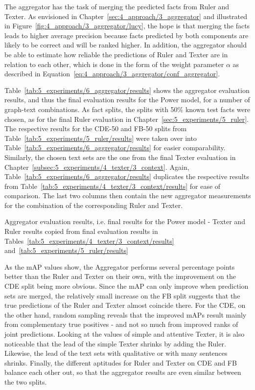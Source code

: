 The aggregator has the task of merging the predicted facts from Ruler and Texter. As envisioned in Chapter~\ref{sec:4_approach/3_aggregator} and illustrated in Figure~\ref{fig:4_approach/3_aggregator/lucy}, the hope is that merging the facts leads to higher average precision because facts predicted by both components are likely to be correct and will be ranked higher. In addition, the aggregator should be able to estimate how reliable the predictions of Ruler and Texter are in relation to each other, which is done in the form of the weight parameter $\alpha$ as described in Equation~\ref{eq:4_approach/3_aggregator/conf_aggregator}.

Table~\ref{tab:5_experiments/6_aggregator/results} shows the aggregator evaluation results, and thus the final evaluation results for the Power model, for a number of graph-text combinations. As fact splits, the splits with 50\% known test facts were chosen, as for the final Ruler evaluation in Chapter~\ref{sec:5_experiments/5_ruler}. The respective results for the CDE-50 and FB-50 splits from Table~\ref{tab:5_experiments/5_ruler/results} were taken over into Table~\ref{tab:5_experiments/6_aggregator/results} for easier comparability. Similarly, the chosen text sets are the one from the final Texter evaluation in Chapter~\ref{subsec:5_experiments/4_texter/3_context}. Again, Table~\ref{tab:5_experiments/6_aggregator/results} duplicates the respective results from Table~\ref{tab:5_experiments/4_texter/3_context/results} for ease of comparison. The last two columns then contain the new aggregator measurements for the combination of the corresponding Ruler and Texter.

\begin{table}[h]
    \makebox[\textwidth][c]{
        
    }
    \caption{Aggregator evaluation results, i.e. final results for the Power model - Texter and Ruler results copied from final evaluation results in Tables~\ref{tab:5_experiments/4_texter/3_context/results} and~\ref{tab:5_experiments/5_ruler/results}}
    \label{tab:5_experiments/6_aggregator/results}
\end{table}

As the mAP values show, the Aggregator performs several percentage points better than the Ruler and Texter on their own, with the improvement on the CDE split being more obvious. Since the mAP can only improve when prediction sets are merged, the relatively small increase on the FB split suggests that the true predictions of the Ruler and Texter almost coincide there. For the CDE, on the other hand, random sampling reveals that the improved mAPs result mainly from complementary true positives - and not so much from improved ranks of joint predictions. Looking at the values of simple and attentive Texter, it is also noticeable that the lead of the simple Texter shrinks by adding the Ruler. Likewise, the lead of the text sets with qualitative or with many sentences shrinks. Finally, the different aptitudes for Ruler and Texter on CDE and FB balance each other out, so that the aggregator results are even similar between the two splits.

